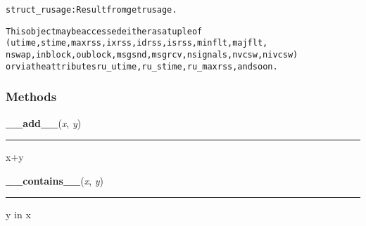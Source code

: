\begin{alltt}
struct\_rusage: Result from getrusage.

This object may be accessed either as a tuple of
    (utime,stime,maxrss,ixrss,idrss,isrss,minflt,majflt,
    nswap,inblock,oublock,msgsnd,msgrcv,nsignals,nvcsw,nivcsw)
or via the attributes ru\_utime, ru\_stime, ru\_maxrss, and so on.
\end{alltt}



  \subsubsection{Methods}

    \label{resource:struct_rusage:__add__}

    \vspace{0.5ex}

\hspace{.8\funcindent}\begin{boxedminipage}{\funcwidth}

    \raggedright \textbf{\_\_add\_\_}(\textit{x}, \textit{y})

    \vspace{-1.5ex}

    \rule{\textwidth}{0.5\fboxrule}
\setlength{\parskip}{2ex}
    x+y

\setlength{\parskip}{1ex}
    \end{boxedminipage}

    \label{resource:struct_rusage:__contains__}

    \vspace{0.5ex}

\hspace{.8\funcindent}\begin{boxedminipage}{\funcwidth}

    \raggedright \textbf{\_\_contains\_\_}(\textit{x}, \textit{y})

    \vspace{-1.5ex}

    \rule{\textwidth}{0.5\fboxrule}
\setlength{\parskip}{2ex}
    y in x

\setlength{\parskip}{1ex}
    \end{boxedminipage}

